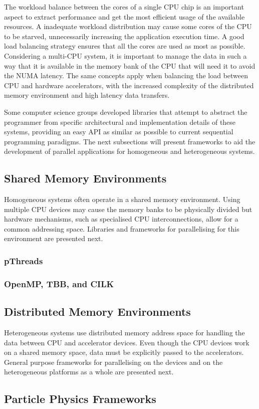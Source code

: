 The workload balance between the cores of a single CPU chip is an important aspect to extract performance and get the most efficient usage of the available resources. A inadequate workload distribution may cause some cores of the CPU to be starved, unnecessarily increasing the application execution time. A good load balancing strategy ensures that all the cores are used as most as possible. Considering a multi-CPU system, it is important to manage the data in such a way that it is available in the memory bank of the CPU that will need it to avoid the NUMA latency. The same concepts apply when balancing the load between CPU and hardware accelerators, with the increased complexity of the distributed memory environment and high latency data transfers.

Some computer science groups developed libraries that attempt to abstract the programmer from specific architectural and implementation details of these systems, providing an easy API as similar as possible to current sequential programming paradigms. The next subsections will present frameworks to aid the development of parallel applications for homogeneous and heterogeneous systems.

\subsection{Shared Memory Environments}
\label{shared_mem}

Homogeneous systems often operate in a shared memory environment. Using multiple CPU devices may cause the memory banks to be physically divided but hardware mechanisms, such as specialised CPU interconnections, allow for a common addressing space. Libraries and frameworks for parallelising for this environment are presented next.

\subsubsection*{pThreads}


\subsubsection*{OpenMP, TBB, and CILK}

\subsection{Distributed Memory Environments}
\label{distributed_mem}

Heterogeneous systems use distributed memory address space for handling the data between CPU and accelerator devices. Even though the CPU devices work on a shared memory space, data must be explicitly passed to the accelerators. General purpose frameworks for parallelising on the devices and on the heterogeneous platforms as a whole are presented next.

\subsection{Particle Physics Frameworks}
\label{particle_frameworks}
